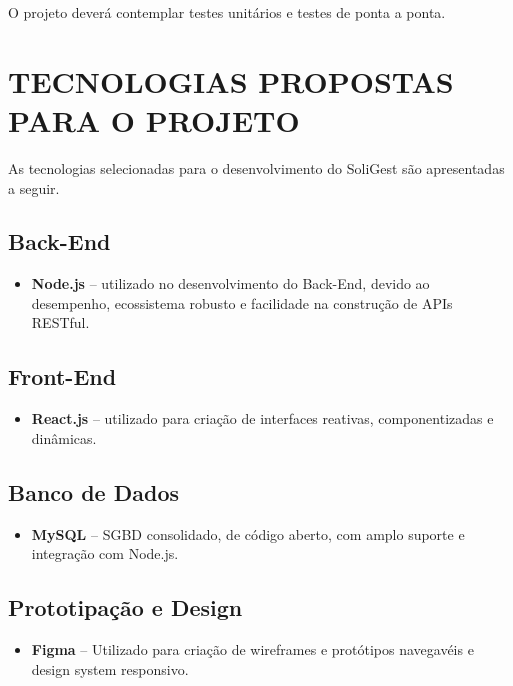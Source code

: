 \documentclass[12pt,a4paper]{article}
\begin{document}
O projeto deverá contemplar testes unitários e testes de ponta a ponta.


\section*{TECNOLOGIAS PROPOSTAS PARA O PROJETO}

As tecnologias selecionadas para o desenvolvimento do SoliGest são
apresentadas a seguir.

\subsection*{Back-End}

\begin{itemize}
    \item \textbf{Node.js} -- utilizado no desenvolvimento do Back-End,
    devido ao desempenho, ecossistema robusto e facilidade na construção
    de APIs RESTful.
\end{itemize}

\subsection*{Front-End}

\begin{itemize}
    \item \textbf{React.js} -- utilizado para criação de interfaces
    reativas, componentizadas e dinâmicas.
\end{itemize}

\subsection*{Banco de Dados}

\begin{itemize}
    \item \textbf{MySQL} -- SGBD consolidado, de código aberto, com
    amplo suporte e integração com Node.js.
\end{itemize}

\subsection*{Prototipação e Design}

\begin{itemize}
    \item \textbf{Figma} -- Utilizado para criação de wireframes e protótipos navegavéis e design system responsivo.
\end{itemize}
\end{document}
